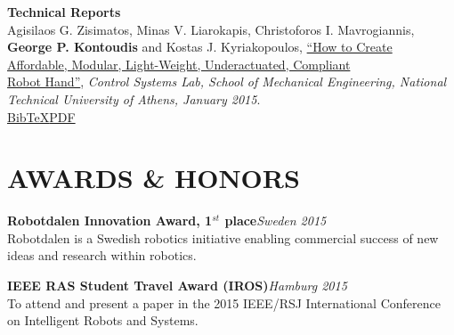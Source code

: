 \documentclass[11pt]{res} %
\begin{document}
\begin{resume}

\small\textbf {Technical Reports}\\\rbrack \hspace{0.1cm} Agisilaos G. Zisimatos, Minas V. Liarokapis, Christoforos I. Mavrogiannis, \small\textbf{George P. Kontoudis} and Kostas J. Kyriakopoulos, \underline{``How to Create Affordable, Modular, Light-Weight, Underactuated, Compliant }\\\underline{Robot Hand''}, {\it Control Systems Lab, School of Mechanical Engineering, National Technical University of Athens, January 2015}.\\\href{http://www.openbionics.org/Zisimatos2015TR.bib}{\lbrack BibTeX\rbrack}\href{http://www.openbionics.org/TR2015_OpenBionics_RobotHandsGuide.pdf}{\lbrack PDF\rbrack}

\vspace{1.0in} %

\section{AWARDS \& HONORS} 
\vspace{5pt} %
\small \textbf  {Robotdalen Innovation Award, 1$^{st}$ place}\hfill {\sl Sweden 2015}\\
Robotdalen is a Swedish robotics initiative enabling commercial success of new ideas and research within robotics. 

\small \textbf  {IEEE RAS Student Travel Award (IROS)}\hfill {\sl Hamburg 2015}\\
To attend and present a paper in the 2015 IEEE/RSJ International Conference on
Intelligent Robots and Systems.


\vspace{0in} %



\end{resume}
\end{document}
